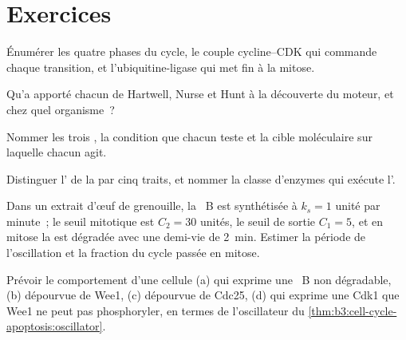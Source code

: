 \section{Exercices}

\begin{exercise}[$\star$]\label{exo:b3:cell-cycle-apoptosis:1}
Énumérer les quatre phases du cycle, le couple cycline--CDK qui
commande chaque transition, et l'ubiquitine-ligase qui met fin à la
mitose.
\end{exercise}

\begin{exercise}[$\star$]\label{exo:b3:cell-cycle-apoptosis:2}
Qu'a apporté chacun de Hartwell, Nurse et Hunt à la découverte du
moteur, et chez quel organisme~?
\end{exercise}

\begin{exercise}[$\star$]\label{exo:b3:cell-cycle-apoptosis:3}
Nommer les trois , la condition que chacun teste et
la cible moléculaire sur laquelle chacun agit.
\end{exercise}

\begin{exercise}[$\star$]\label{exo:b3:cell-cycle-apoptosis:4}
Distinguer l' de la  par cinq traits, et nommer la
classe d'enzymes qui exécute l'.
\end{exercise}

\begin{exercise}[$\star\star$]\label{exo:b3:cell-cycle-apoptosis:5}
Dans un extrait d'œuf de grenouille, la ~B est synthétisée à
$k_{s} = 1$ unité par minute~; le seuil mitotique est $C_{2} = 30$
unités, le seuil de sortie $C_{1} = 5$, et en mitose la  est
dégradée avec une demi-vie de \qty{2}{min}. Estimer la période de
l'oscillation et la fraction du cycle passée en mitose.
\end{exercise}

\begin{exercise}[$\star\star$]\label{exo:b3:cell-cycle-apoptosis:6}
Prévoir le comportement d'une cellule (a) qui exprime une ~B non
dégradable, (b) dépourvue de Wee1, (c) dépourvue de Cdc25, (d) qui
exprime une Cdk1 que Wee1 ne peut pas phosphoryler, en termes de
l'oscillateur du \cref{thm:b3:cell-cycle-apoptosis:oscillator}.
\end{exercise}

